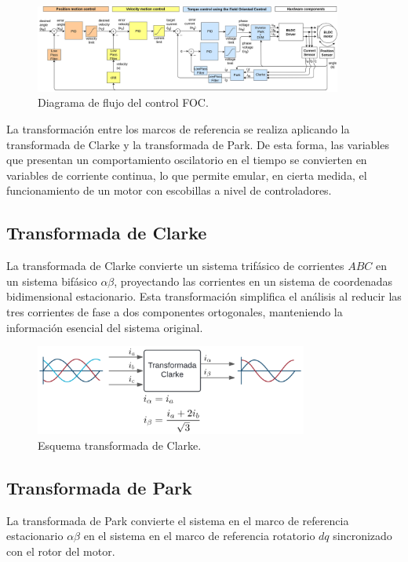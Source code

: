 \documentclass[11pt]{report}
\begin{document}
\begin{figure}[ht]
	\centering
	\includegraphics[width=0.9\textwidth]{imagenes/Diagramas/simpleFOC.jpg}
	\caption{Diagrama de flujo del control FOC.\cite{Skuric_SimpleFOC_A_Field_2022}}
	\label{fig:foc_transform}
\end{figure}
\FloatBarrier

La transformación entre los marcos de referencia se realiza aplicando la transformada de Clarke y la transformada de Park. De esta forma, las variables que presentan un comportamiento oscilatorio en el tiempo se convierten en variables de corriente continua, lo que permite emular, en cierta medida, el funcionamiento de un motor con escobillas a nivel de controladores. \cite{power_conv_14}

\subsection{Transformada de Clarke}
La transformada de Clarke convierte un sistema trifásico de corrientes \(ABC\) en un sistema bifásico \(\alpha\beta\), proyectando las corrientes en un sistema de coordenadas bidimensional estacionario. Esta transformación simplifica el análisis al reducir las tres corrientes de fase a dos componentes ortogonales, manteniendo la información esencial del sistema original. \cite{AN1078}


\begin{figure}[ht]
	\centering
	\includegraphics[width=0.8\textwidth]{imagenes/Diagramas/clarke.png}
	\caption{Esquema transformada de Clarke.}
	\label{fig:clarke_transform}
\end{figure}
\FloatBarrier

\newpage
\subsection{Transformada de Park}
La transformada de Park convierte el sistema en el marco de referencia estacionario \(\alpha\beta\) en el sistema en el marco de referencia rotatorio \(dq\) sincronizado con el rotor del motor. \cite{AN1078}
\end{document}
